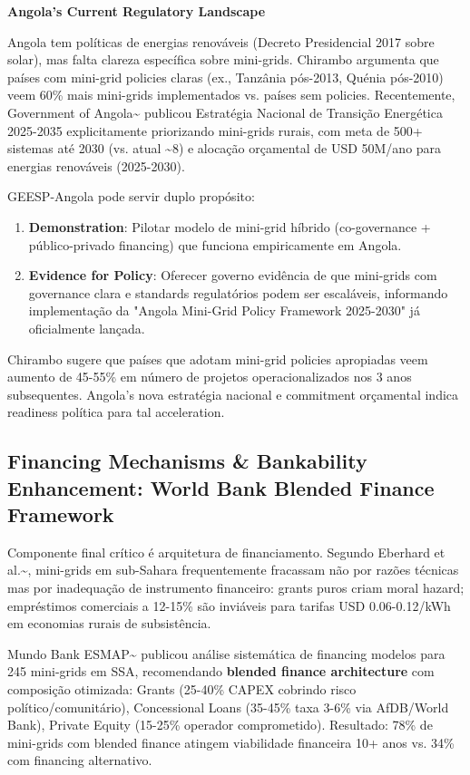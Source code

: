 \documentclass[12pt, a4paper]{article}
\begin{document}
\textbf{Angola's Current Regulatory Landscape}

Angola tem políticas de energias renováveis (Decreto Presidencial 2017 sobre solar), mas falta clareza específica sobre mini-grids. Chirambo argumenta que países com mini-grid policies claras (ex., Tanzânia pós-2013, Quénia pós-2010) veem 60\% mais mini-grids implementados vs. países sem policies. Recentemente, Government of Angola\textasciitilde{}\citep{GovernmentAngola2024} publicou Estratégia Nacional de Transição Energética 2025-2035 explicitamente priorizando mini-grids rurais, com meta de 500+ sistemas até 2030 (vs. atual \textasciitilde{}8) e alocação orçamental de USD 50M/ano para energias renováveis (2025-2030).

GEESP-Angola pode servir duplo propósito:
\begin{enumerate}
\item \textbf{Demonstration}: Pilotar modelo de mini-grid híbrido (co-governance + público-privado financing) que funciona empiricamente em Angola.
\item \textbf{Evidence for Policy}: Oferecer governo evidência de que mini-grids com governance clara e standards regulatórios podem ser escaláveis, informando implementação da "Angola Mini-Grid Policy Framework 2025-2030" já oficialmente lançada.
\end{enumerate}

Chirambo sugere que países que adotam mini-grid policies apropiadas veem aumento de 45-55\% em número de projetos operacionalizados nos 3 anos subsequentes. Angola's nova estratégia nacional e commitment orçamental indica readiness política para tal acceleration.

\subsection{Financing Mechanisms \& Bankability Enhancement: World Bank Blended Finance Framework}

Componente final crítico é arquitetura de financiamento. Segundo Eberhard et al.\textasciitilde{}\citep{Eberhard2020}, mini-grids em sub-Sahara frequentemente fracassam não por razões técnicas mas por inadequação de instrumento financeiro: grants puros criam moral hazard; empréstimos comerciais a 12-15\% são inviáveis para tarifas USD 0.06-0.12/kWh em economias rurais de subsistência. 

Mundo Bank ESMAP\textasciitilde{}\citep{WorldBankESMAP2024} publicou análise sistemática de financing modelos para 245 mini-grids em SSA, recomendando \textbf{blended finance architecture} com composição otimizada: Grants (25-40\% CAPEX cobrindo risco político/comunitário), Concessional Loans (35-45\% taxa 3-6\% via AfDB/World Bank), Private Equity (15-25\% operador comprometido). Resultado: 78\% de mini-grids com blended finance atingem viabilidade financeira 10+ anos vs. 34\% com financing alternativo. 
\end{document}
